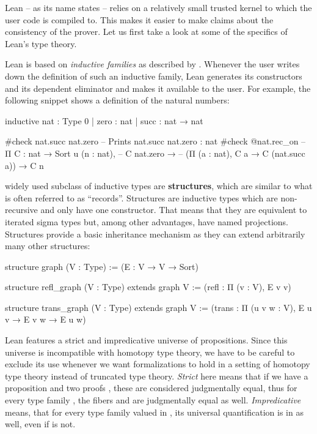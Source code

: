 Lean -- as its name states -- relies on a relatively small trusted kernel to which
the user code is compiled to.
This makes it easier to make claims about the consistency of the prover.
Let us first take a look at some of the specifics of Lean's type theory.

Lean is based on \emph{inductive families} as described by \citet{dybjer94}.
Whenever the user writes down the definition of such an inductive family,
Lean generates its constructors and its dependent eliminator and makes
it available to the user.
For example, the following snippet shows a definition of the natural numbers:
\begin{leancodebr}
inductive nat : Type 0
| zero : nat
| succ : nat → nat

#check nat.succ nat.zero -- Prints nat.succ nat.zero : nat
#check @nat.rec_on -- Π {C : nat → Sort u} (n : nat),
                   --   C nat.zero →
                   --   (Π (a : nat), C a → C (nat.succ a)) → C n
\end{leancodebr}

 widely used subclass of inductive types are \textbf{structures}, which are
similar to what is often referred to as ``records''.
Structures are inductive types which are non-recursive and only have one constructor.
That means that they are equivalent to iterated sigma types but, among other advantages,
have named projections.
Structures provide a basic inheritance mechanism as they can extend arbitrarily
many other structures:
\begin{leancode}
structure graph (V : Type) :=
  (E : V → V → Sort)

structure refl_graph (V : Type) extends graph V :=
  (refl : Π (v : V), E v v)

structure trans_graph (V : Type) extends graph V :=
  (trans : Π (u v w : V), E u v → E v w → E u w)
\end{leancode}

Lean features a strict and impredicative universe  of propositions.
Since this universe is incompatible with homotopy type theory, we have to be
careful to exclude its use whenever we want formalizations to hold in
a setting of homotopy type theory instead of truncated type theory.
\emph{Strict} here means that if we have a proposition  and two
proofs , these are considered judgmentally equal, thus for
every type family , the fibers  and 
are judgmentally equal as well.
\emph{Impredicative} means, that for every type family valued in ,
its universal quantification  is in  as well, even
if  is not.

